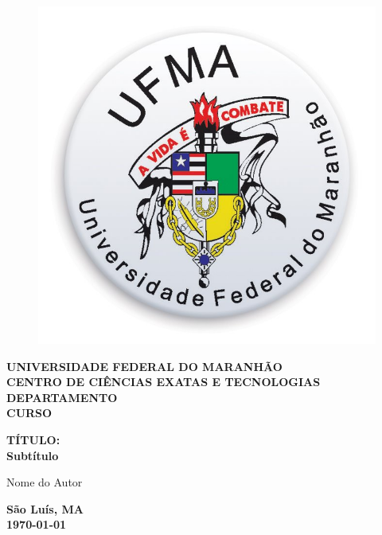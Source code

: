 \documentclass[
	12pt,				%
	oneside,			%
	a4paper,			%
	english,			%
	french,				%
	spanish,			%
	brazil				%
	]{abntex2}
\begin{document}

\frenchspacing 

\pretextual

\begin{center}			
	\begin{figure}[htb]
		\centering
		\includegraphics[scale=0.15]{ufmalogo.jpg}
	\end{figure}
				
			\textbf{UNIVERSIDADE FEDERAL DO MARANHÃO \\
					CENTRO DE CIÊNCIAS EXATAS E TECNOLOGIAS \\
					DEPARTAMENTO \\
					CURSO\\\vspace{5cm}}
					
					\textbf{\large{TÍTULO:}\\
					\large{Subtítulo}}
					\vspace{3.5cm}
					\begin{flushright}
						\textnormal{Nome do Autor}
					\end{flushright}
					\vspace{4.5cm}
					\textbf{São Luís, MA \\ \today}
\end{center}
\end{document}

